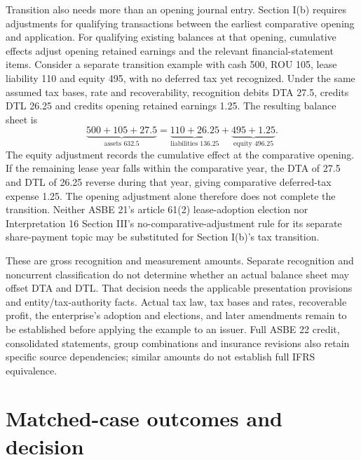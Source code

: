 Transition also needs more than an opening journal entry. Section I(b) requires adjustments for qualifying transactions between the earliest comparative opening and application. For qualifying existing balances at that opening, cumulative effects adjust opening retained earnings and the relevant financial-statement items. Consider a separate transition example with cash 500, ROU 105, lease liability 110 and equity 495, with no deferred tax yet recognized. Under the same assumed tax bases, rate and recoverability, recognition debits DTA 27.5, credits DTL 26.25 and credits opening retained earnings 1.25. The resulting balance sheet is
\[
\underbrace{500+105+27.5}_{\text{assets }632.5}
=\underbrace{110+26.25}_{\text{liabilities }136.25}
+\underbrace{495+1.25}_{\text{equity }496.25}.
\]
The equity adjustment records the cumulative effect at the comparative opening. If the remaining lease year falls within the comparative year, the DTA of 27.5 and DTL of 26.25 reverse during that year, giving comparative deferred-tax expense 1.25. The opening adjustment alone therefore does not complete the transition. Neither ASBE 21's article 61(2) lease-adoption election nor Interpretation 16 Section III's no-comparative-adjustment rule for its separate share-payment topic may be substituted for Section I(b)'s tax transition.

These are gross recognition and measurement amounts. Separate recognition and noncurrent classification do not determine whether an actual balance sheet may offset DTA and DTL. That decision needs the applicable presentation provisions and entity/tax-authority facts. Actual tax law, tax bases and rates, recoverable profit, the enterprise's adoption and elections, and later amendments remain to be established before applying the example to an issuer. Full ASBE 22 credit, consolidated statements, group combinations and insurance revisions also retain specific source dependencies; similar amounts do not establish full IFRS equivalence.

\hypertarget{matched-case-outcomes-and-decision}{%
\section{Matched-case outcomes and decision}\label{method-standards-methods-matched-case-outcomes-and-decision}}


